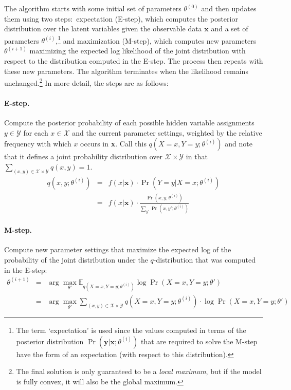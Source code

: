 \noindent The algorithm starts with some initial set of parameters
$\theta^{(0)}$ and then updates them using two steps:\ expectation
(E-step), which computes the posterior distribution over the latent
variables given the observable data $\textbf{x}$ and a set of
parameters $\theta^{(i)}$,\footnote{The term `expectation' is used
  since the values computed in terms of the posterior distribution
  $\Pr(\textbf{y}|\textbf{x};\theta^{(i)})$ that are required to solve
  the M-step have the form of an expectation (with respect to this
  distribution).} and maximization (M-step), which computes new
parameters $\theta^{(i+1)}$ maximizing the expected log likelihood of
the joint distribution with respect to the distribution computed in
the E-step.  The process then repeats with these new parameters.  The
algorithm terminates when the likelihood remains
unchanged.\footnote{The final solution is only guaranteed to be a
  \emph{local maximum}, but if the model is fully convex, it will also
  be the global maximum.} In more detail, the steps are as follows:

\paragraph{\textbf{E-step.}}
Compute the posterior probability of each possible hidden variable
assignments $y \in \mathcal{Y}$ for each $x \in \mathcal{X}$ and the
current parameter settings, weighted by the relative frequency with
which $x$ occurs in \textbf{x}.  Call this $q(X=x,Y=y;\theta^{(i)})$
and note that it defines a joint probability distribution over
$\mathcal{X} \times \mathcal{Y}$ in that $\sum_{(x,y) \in \mathcal{X}
  \times \mathcal{Y}} q(x,y) = 1$.
\begin{eqnarray}
q(x,y;\theta^{(i)}) & = & f(x|\textbf{x}) \cdot \Pr(Y=y|X=x;\theta^{(i)}) \\
& = &f(x|\textbf{x}) \cdot \frac{\Pr(x,y;\theta^{(i)})}{\sum_{y'}
  \Pr(x,y';\theta^{(i)})}
\end{eqnarray}

\paragraph{\textbf{M-step.}}
Compute new parameter settings that maximize the expected log of the
probability of the joint distribution under the $q$-distribution that
was computed in the E-step:
\begin{eqnarray}
\theta^{(i+1)} & = &\arg \max_{\theta'} \mathbb{E}_{q(X=x,Y=y;\theta^{(i)})} \log \Pr(X=x,Y=y ; \theta') \\
& = &\arg \max_{\theta'} \sum_{(x,y) \in \mathcal{X} \times \mathcal{Y}} q(X=x,Y=y;\theta^{(i)}) \cdot \log \Pr(X=x,Y=y ; \theta') \nonumber
\end{eqnarray}

